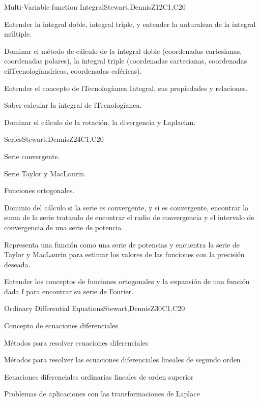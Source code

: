 \begin{syllabus}
\begin{unit}{Multi-Variable function Integral}{}{Stewart,DennisZ}{12}{C1,C20}
  \begin{learningoutcomes}
    \item Entender la integral doble, integral triple, y entender la naturaleza de la integral múltiple.
    \item Dominar el método de cálculo de la integral doble (coordenadas cartesianas, coordenadas polares), la integral triple (coordenadas cartesianas, coordenadas cilTecnologíandricas, coordenadas esféricas).
    \item Entender el concepto de lTecnologíanea Integral, sus propiedades y relaciones.
    \item Saber calcular la integral de lTecnologíanea.
    \item Dominar el cálculo de la rotación, la divergencia y Laplacian.
  
    \end{learningoutcomes}

\end{unit}

\begin{unit}{Series}{}{Stewart,DennisZ}{24}{C1,C20}
   \begin{topics}
    \item Serie convergente.
    \item Serie Taylor y MacLaurin.
    \item Funciones ortogonales.
 \end{topics}

   \begin{learningoutcomes}
    \item Dominio del cálculo si la serie es convergente, y si es convergente, encontrar la suma de la serie tratando de encontrar el radio de convergencia y el intervalo de convergencia de una serie de potencia.
    \item Representa una función como una serie de potencias y encuentra la serie de Taylor y MacLaurin para estimar los valores de las funciones con la precisión deseada.
    \item Entender los conceptos de funciones ortogonales y la expansión de una función dada f para encontrar su serie de Fourier.
     \end{learningoutcomes}
\end{unit}

\begin{unit}{Ordinary Differential Equations}{}{Stewart,DennisZ}{30}{C1,C20}
   \begin{topics}
    \item Concepto de ecuaciones diferenciales
    \item Métodos para resolver ecuaciones diferenciales
    \item Métodos para resolver las ecuaciones diferenciales lineales de segundo orden
    \item Ecuaciones diferenciales ordinarias lineales de orden superior
    \item Problemas de aplicaciones con las transformaciones de Laplace
      \end{topics}


\end{unit}
\end{syllabus}
